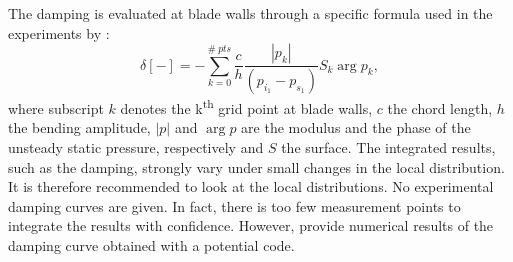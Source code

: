 The damping is evaluated at blade walls through a specific formula
used in the experiments by \citet{Fransson1999}:
\begin{equation}
    \delta [-] = - \sum^{\#~pts}_{k=0} \frac{c}{h} 
      \frac{|p_k|}{(p_{i_1} - p_{s_1})} S_k \arg p_k,
\end{equation}
where subscript $k$ denotes the k\textsuperscript{th}
grid point at blade walls, $c$ the chord length,
$h$ the bending amplitude, $| p |$ 
and $\arg p$ are the modulus and the phase of the
unsteady static pressure, respectively and $S$ the surface.
The integrated
results, such as the damping, strongly vary under small changes in the
local distribution. It is therefore recommended to look at the local
distributions. No experimental damping curves are given. In fact,
there is too few measurement points to integrate the results with
confidence. However, \citet{Fransson1999}
provide numerical results of the damping curve obtained with a potential code.

